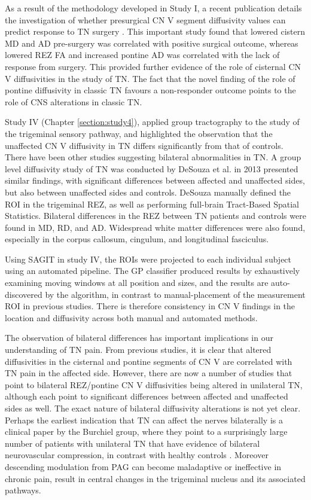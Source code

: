 As a result of the methodology developed in Study I, a recent publication details the investigation of whether presurgical CN V segment diffusivity values can predict response to TN surgery \cite{Hung2017}. This important study found that lowered cistern MD and AD pre-surgery was correlated with positive surgical outcome, whereas lowered REZ FA and increased pontine AD was correlated with the lack of response from surgery. This provided further evidence of the role of cisternal CN V diffusivities in the study of TN. The fact that the novel finding of the role of pontine diffusivity in classic TN favours a non-responder outcome points to the role of CNS alterations in classic TN.

Study IV (Chapter \ref{section:study4}), applied group tractography to the study of the trigeminal sensory pathway, and highlighted the observation that the unaffected CN V diffusivity in TN differs significantly from that of controls. There have been other studies suggesting bilateral abnormalities in TN. A group level diffusivity study of TN was conducted by DeSouza et al. in 2013 \cite{Desouza2013} presented similar findings, with significant differences between affected and unaffected sides, but also between unaffected sides and controls. DeSouza manually defined the ROI in the trigeminal REZ, as well as performing full-brain Tract-Based Spatial Statistics. Bilateral differences in the REZ between TN patients and controls were found in MD, RD, and AD. Widespread white matter differences were also found, especially in the corpus callosum, cingulum, and longitudinal fasciculus.

Using SAGIT in study IV, the ROIs were projected to each individual subject using an automated pipeline. The GP classifier produced results by exhaustively examining moving windows at all position and sizes, and the results are auto-discovered by the algorithm, in contrast to manual-placement of the measurement ROI in previous studies. There is therefore consistency in CN V findings in the location and diffusivity across both manual and automated methods.

The observation of bilateral differences has important implications in our understanding of TN pain. From previous studies, it is clear that altered diffusivities in the cisternal and pontine segments of CN V are correlated with TN pain in the affected side. However, there are now a number of studies that point to bilateral REZ/pontine CN V diffusivities being altered in unilateral TN, although each point to significant differences between affected and unaffected sides as well. The exact nature of bilateral diffusivity alterations is not yet clear. Perhaps the earliest indication that TN can affect the nerves bilaterally is a clinical paper by the Burchiel group, where they point to a surprisingly large number of patients with unilateral TN that have evidence of bilateral neurovascular compression, in contrast with healthy controls \cite{Miller2009}. Moreover descending modulation from PAG can become maladaptive or ineffective in chronic pain, result in central changes in the trigeminal nucleus and its associated pathways.

